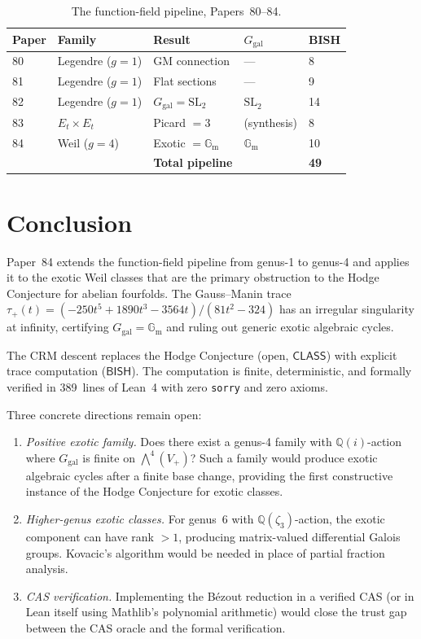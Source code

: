 \documentclass[11pt]{article}
\theoremstyle{plain}
\theoremstyle{definition}
\theoremstyle{remark}
\newcommand{\Q}{\mathbb{Q}}
\newcommand{\SL}{\mathrm{SL}}
\newcommand{\Ggal}{G_{\mathrm{gal}}}
\newcommand{\Gm}{\mathbb{G}_{\mathrm{m}}}
\newcommand{\BISH}{\ensuremath{\mathsf{BISH}}}
\newcommand{\CLASS}{\ensuremath{\mathsf{CLASS}}}
\begin{document}
\begin{table}[h]
\centering
\small
\begin{tabular}{@{}lllll@{}}
\toprule
\textbf{Paper} & \textbf{Family} & \textbf{Result} & $\Ggal$ & \textbf{BISH} \\
\midrule
80 & Legendre ($g=1$) & GM connection & --- & 8 \\
81 & Legendre ($g=1$) & Flat sections & --- & 9 \\
82 & Legendre ($g=1$) & $\Ggal = \SL_2$ & $\SL_2$ & 14 \\
83 & $E_t \times E_t$ & Picard $= 3$ & (synthesis) & 8 \\
84 & Weil ($g=4$) & Exotic $= \Gm$ & $\Gm$ & 10 \\
\midrule
& & \textbf{Total pipeline} & & \textbf{49} \\
\bottomrule
\end{tabular}
\caption{The function-field pipeline, Papers~80--84.}
\label{tab:pipeline}
\end{table}

\section{Conclusion}

Paper~84 extends the function-field pipeline from genus-1 to genus-4
and applies it to the exotic Weil classes that are the primary obstruction
to the Hodge Conjecture for abelian fourfolds. The Gauss--Manin trace
$\tau_+(t) = (-250t^5 + 1890t^3 - 3564t)/(81t^2 - 324)$ has an irregular
singularity at infinity, certifying $\Ggal = \Gm$ and ruling out generic
exotic algebraic cycles.

The CRM descent replaces the Hodge Conjecture (open, $\CLASS$) with explicit
trace computation ($\BISH$). The computation is finite, deterministic, and
formally verified in 389~lines of Lean~4 with zero \texttt{sorry} and
zero axioms.

Three concrete directions remain open:
\begin{enumerate}[nosep]
\item \emph{Positive exotic family.} Does there exist a genus-4 family
  with $\Q(i)$-action where $\Ggal$ is finite on $\bigwedge^4(V_+)$?
  Such a family would produce exotic algebraic cycles after a finite
  base change, providing the first constructive instance of the Hodge
  Conjecture for exotic classes.
\item \emph{Higher-genus exotic classes.} For genus~6 with $\Q(\zeta_3)$-action,
  the exotic component can have rank $> 1$, producing matrix-valued
  differential Galois groups. Kovacic's algorithm would be needed in
  place of partial fraction analysis.
\item \emph{CAS verification.} Implementing the B\'ezout reduction in
  a verified CAS (or in Lean itself using Mathlib's polynomial
  arithmetic) would close the trust gap between the CAS oracle and
  the formal verification.
\end{enumerate}
\end{document}
